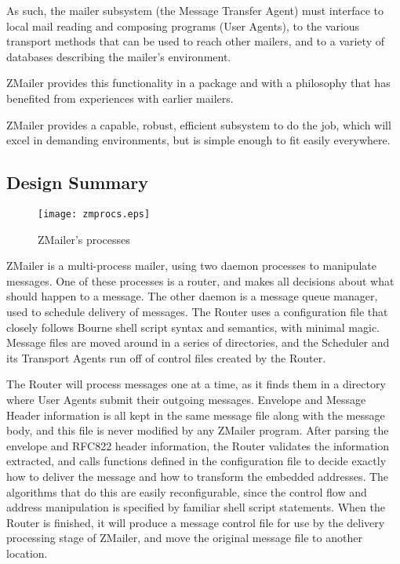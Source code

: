 As such, the mailer subsystem (the Message Transfer Agent) must
interface to local mail reading and composing programs (User Agents),
to the various transport methods that can be used to reach other mailers,
and to a variety of databases describing the mailer's environment.

ZMailer provides this functionality in a package and with a philosophy
that has benefited from experiences with earlier mailers.

ZMailer provides a capable, robust, efficient subsystem to do the job,
which will excel in demanding environments, but is simple enough to
fit easily everywhere.


\subsection{Design Summary}

\begin{figure}[ht]
  \centering
  \texttt{[image: zmprocs.eps]}
  \caption{\label{fig:zmprocs}ZMailer's processes}
\end{figure}


ZMailer is a multi-process mailer, using two daemon processes to manipulate
messages.  One of these processes is a router, and makes all decisions
about what should happen to a message.  The other daemon is a message queue
manager, used to schedule delivery of messages.  The Router uses a
configuration file that closely follows Bourne shell script syntax and
semantics, with minimal magic.  Message files are moved around in a series
of directories, and the Scheduler and its Transport Agents run off of
control files created by the Router.

The Router will process messages one at a time, as it finds them in a
directory where User Agents submit their outgoing messages.  Envelope and
Message Header information is all kept in the same message file along with
the message body, and this file is never modified by any ZMailer program.
After parsing the envelope and RFC822 header information, the Router
validates the information extracted, and calls functions defined in the
configuration file to decide exactly how to deliver the message and how to
transform the embedded addresses.  The algorithms that do this are easily
reconfigurable, since the control flow and address manipulation is
specified by familiar shell script statements.  When the Router is
finished, it will produce a message control file for use by the delivery
processing stage of ZMailer, and move the original message file to another
location.

